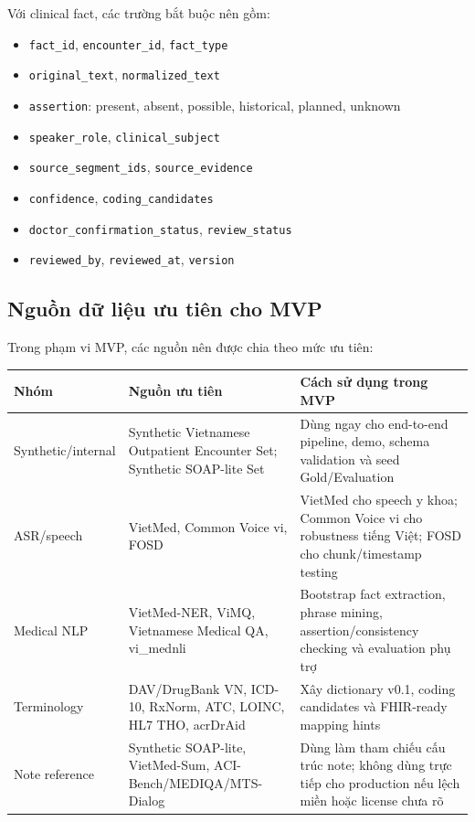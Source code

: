 \documentclass[12pt,a4paper]{article}
\begin{document}
Với clinical fact, các trường bắt buộc nên gồm:

\begin{itemize}
    \item \texttt{fact\_id}, \texttt{encounter\_id}, \texttt{fact\_type}
    \item \texttt{original\_text}, \texttt{normalized\_text}
    \item \texttt{assertion}: present, absent, possible, historical, planned, unknown
    \item \texttt{speaker\_role}, \texttt{clinical\_subject}
    \item \texttt{source\_segment\_ids}, \texttt{source\_evidence}
    \item \texttt{confidence}, \texttt{coding\_candidates}
    \item \texttt{doctor\_confirmation\_status}, \texttt{review\_status}
    \item \texttt{reviewed\_by}, \texttt{reviewed\_at}, \texttt{version}
\end{itemize}

\subsection{Nguồn dữ liệu ưu tiên cho MVP}

Trong phạm vi MVP, các nguồn nên được chia theo mức ưu tiên:

\begin{longtable}{p{3.2cm} p{4.5cm} p{6cm}}
\toprule
\textbf{Nhóm} & \textbf{Nguồn ưu tiên} & \textbf{Cách sử dụng trong MVP} \\
\midrule
Synthetic/internal & Synthetic Vietnamese Outpatient Encounter Set; Synthetic SOAP-lite Set & Dùng ngay cho end-to-end pipeline, demo, schema validation và seed Gold/Evaluation \\
\midrule
ASR/speech & VietMed, Common Voice vi, FOSD & VietMed cho speech y khoa; Common Voice vi cho robustness tiếng Việt; FOSD cho chunk/timestamp testing \\
\midrule
Medical NLP & VietMed-NER, ViMQ, Vietnamese Medical QA, vi\_mednli & Bootstrap fact extraction, phrase mining, assertion/consistency checking và evaluation phụ trợ \\
\midrule
Terminology & DAV/DrugBank VN, ICD-10, RxNorm, ATC, LOINC, HL7 THO, acrDrAid & Xây dictionary v0.1, coding candidates và FHIR-ready mapping hints \\
\midrule
Note reference & Synthetic SOAP-lite, VietMed-Sum, ACI-Bench/MEDIQA/MTS-Dialog & Dùng làm tham chiếu cấu trúc note; không dùng trực tiếp cho production nếu lệch miền hoặc license chưa rõ \\
\bottomrule
\end{longtable}
\end{document}

